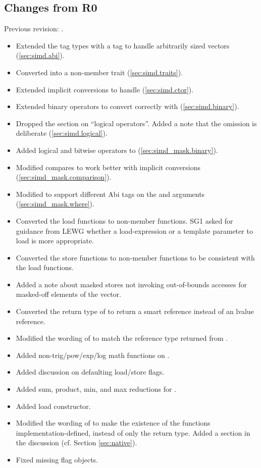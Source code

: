 \subsection{Changes from R0}
Previous revision: \parencite{P0214R0}.
\begin{itemize}
  \item Extended the  tag types with a  tag to handle arbitrarily sized vectors (\ref{sec:simd.abi}).
  \item Converted  into a non-member trait (\ref{sec:simd.traits}).
  \item Extended implicit conversions to handle \fixedsizeN (\ref{sec:simd.ctor}).
  \item Extended binary operators to convert correctly with \fixedsizeN (\ref{sec:simd.binary}).
  \item Dropped the section on “\simd logical operators”. Added a note that the omission is deliberate (\ref{sec:simd.logical}).
  \item Added logical and bitwise operators to \mask (\ref{sec:simd_mask.binary}).
  \item Modified \mask compares to work better with implicit conversions (\ref{sec:simd_mask.comparison}).
  \item Modified  to support different Abi tags on the \mask and \simd arguments (\ref{sec:simd_mask.where}).
  \item Converted the load functions to non-member functions.
    SG1 asked for guidance from LEWG whether a load-expression or a template parameter to load is more appropriate.
  \item Converted the store functions to non-member functions to be consistent with the load functions.
  \item Added a note about masked stores not invoking out-of-bounds accesses for masked-off elements of the vector.
  \item Converted the return type of \simd{} to return a smart reference instead of an lvalue reference.
  \item Modified the wording of \mask{} to match the reference type returned from \simd{}.
  \item Added non-trig/pow/exp/log math functions on \simd.
  \item Added discussion on defaulting load/store flags.
  \item Added sum, product, min, and max reductions for \simd.
  \item Added load constructor.
  \item Modified the wording of  to make the existence of the functions implementation-defined, instead of only the return type.
    Added a section in the discussion (cf. Section \ref{sec:native}).
  \item Fixed missing flag objects.
\end{itemize}

